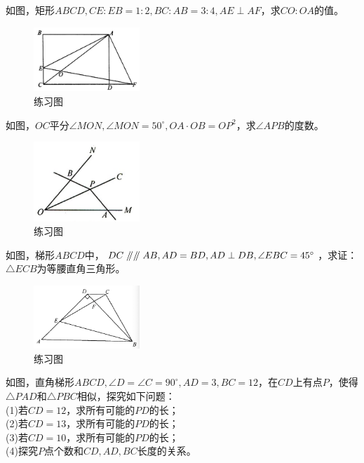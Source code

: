 \documentclass{ecnuthesis}
\newcommand\px{\mathrel{/\mkern-5mu/}}  %
\begin{document}
\begin{problem}
    如图，矩形$ABCD,CE:EB=1:2,BC:AB=3:4,AE\perp AF$，求$CO:OA$的值。
\end{problem}
\begin{figure}[H]
\centering
\includegraphics[width=4cm]{picture/848.png}
\caption{练习图}
\end{figure}
\begin{problem}
    如图，$OC$平分$\angle MON,\angle MON=50^\circ,OA·OB=OP^2$，求$\angle APB$的度数。
\end{problem}
\begin{figure}[H]
\centering
\includegraphics[width=4cm]{picture/849.png}
\caption{练习图}
\end{figure}
\begin{problem}
    如图，梯形$ABCD$中，$DC\px \px AB,AD=BD,AD\perp DB,\angle EBC=45^\circ$，求证：$\triangle ECB$为等腰直角三角形。
\end{problem}
\begin{figure}[H]
\centering
\includegraphics[width=4cm]{picture/835.png}
\caption{练习图}
\end{figure}
\begin{problem}
    如图，直角梯形$ABCD,\angle D=\angle C=90^\circ,AD=3,BC=12$，在$CD$上有点$P$，使得$\triangle PAD$和$\triangle PBC$相似，探究如下问题：\\
    (1)若$CD=12$，求所有可能的$PD$的长； \\
    (2)若$CD=13$，求所有可能的$PD$的长； \\
    (3)若$CD=10$，求所有可能的$PD$的长； \\
    (4)探究$P$点个数和$CD,AD,BC$长度的关系。
\end{problem}
\end{document}
